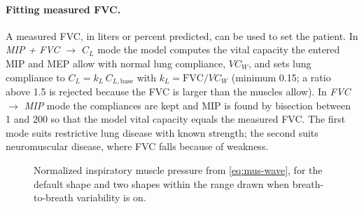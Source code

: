 \paragraph{Fitting measured FVC.} A measured FVC, in liters or percent predicted, can be used to set the patient. In \emph{MIP + FVC $\to$ $C_L$} mode the model computes the vital capacity the entered MIP and MEP allow with normal lung compliance, $VC_W$, and sets lung compliance to $C_L=k_L\,C_{L,\mathrm{base}}$ with $k_L=\mathrm{FVC}/VC_W$ (minimum 0.15; a ratio above 1.5 is rejected because the FVC is larger than the muscles allow). In \emph{FVC $\to$ MIP} mode the compliances are kept and MIP is found by bisection between 1 and \SI{200}{\cmH} so that the model vital capacity equals the measured FVC. The first mode suits restrictive lung disease with known strength; the second suits neuromuscular disease, where FVC falls because of weakness.

\begin{figure}[ht]
\centering
{}
\caption{Normalized inspiratory muscle pressure from \cref{eq:mus-wave}, for the default shape and two shapes within the range drawn when breath-to-breath variability is on.}
\label{fig:mus-wave}
\end{figure}


